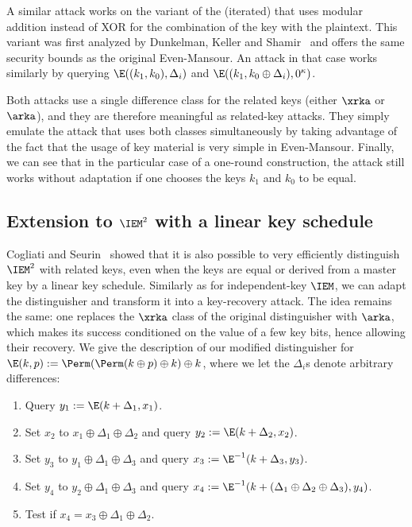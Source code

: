 A similar attack works on the variant of the (iterated) \EM 
that uses modular addition instead of XOR for the combination of the key with the plaintext.
This variant was first analyzed by Dunkelman, Keller and Shamir~\cite{DKS12} and offers the same security bounds as the
original Even-Mansour. An attack in that case works similarly
by querying \eg $\E((k_1, k_0), \Delta_i)$ and
$\E((k_1, k_0 \oplus \Delta_i), 0^\kappa)$.

Both attacks use a single difference class for the related keys (either $\xrka$ or $\arka$),
and they are therefore meaningful as related-key attacks. They simply emulate the attack that uses both
classes simultaneously by taking advantage of the fact that the usage of key material is very simple in
Even-Mansour.
Finally, we can see that in the particular case of a one-round construction, the attack still works without
adaptation if one
chooses the keys $k_1$ and $k_0$ to be equal.

\subsection{Extension to $\IEM^2$ with a linear key schedule}

Cogliati and Seurin~\cite{CS15} showed that it is also possible to very efficiently distinguish
$\IEM^2$ with related keys, even when the keys are equal or derived
from a master key by a linear key schedule. Similarly as for independent-key $\IEM$, we can adapt
the distinguisher and transform it into a key-recovery attack. The idea remains the same: one
replaces the $\xrka$ class of the original distinguisher with $\arka$, which makes its success
conditioned on the value of a few key bits, hence allowing their recovery. We give
the description of our modified distinguisher for $\E(k, p) := \Perm(\Perm(k \oplus p) \oplus k) \oplus k$,
where we let the $\Delta_i$s denote arbitrary differences:

\begin{enumerate}[leftmargin=4em]
	\item Query $y_1 := \E(k + \Delta_1, x_1)$.
	\item Set $x_2$ to $x_1 \oplus \Delta_1 \oplus \Delta_2$ and query $y_2 := \E(k + \Delta_2, x_2)$.
	\item Set $y_3$ to $y_1 \oplus \Delta_1 \oplus \Delta_3$ and query $x_3 := \E^{-1}(k + \Delta_3, y_3)$.
	\item Set $y_4$  to $y_2 \oplus \Delta_1 \oplus \Delta_3$ and query $x_4 := \E^{-1}(k + (\Delta_1 \oplus \Delta_2 \oplus \Delta_3), y_4)$.
	\item Test if $x_4 = x_3 \oplus \Delta_1 \oplus \Delta_2$.
\end{enumerate}

